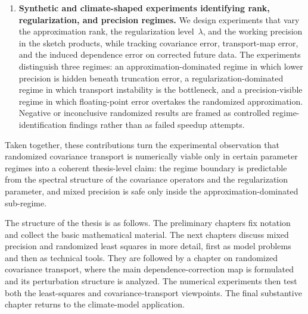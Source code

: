 \begin{enumerate}
	\item \textbf{Synthetic and climate-shaped experiments identifying rank,
		      regularization, and precision regimes.}
	      We design experiments that vary the approximation rank, the
	      regularization level~\(\lambda\), and the working precision in the sketch
	      products, while tracking covariance error, transport-map error, and the
	      induced dependence error on corrected future data.  The experiments
	      distinguish three regimes: an approximation-dominated regime in which
	      lower precision is hidden beneath truncation error, a
	      regularization-dominated regime in which transport instability is the
	      bottleneck, and a precision-visible regime in which floating-point error
	      overtakes the randomized approximation.  Negative or inconclusive
	      randomized results are framed as controlled regime-identification findings
	      rather than as failed speedup attempts.
\end{enumerate}

Taken together, these contributions turn the experimental observation that
randomized covariance transport is numerically viable only in certain parameter
regimes into a coherent thesis-level claim: the regime boundary is predictable
from the spectral structure of the covariance operators and the regularization
parameter, and mixed precision is safe only inside the approximation-dominated
sub-regime.

The structure of the thesis is as follows. The preliminary chapters fix notation and
collect the basic mathematical material. The next chapters discuss mixed
precision and randomized least squares in more detail, first as model problems
and then as technical tools. They are followed by a chapter on randomized
covariance transport, where the main dependence-correction map is formulated and
its perturbation structure is analyzed. The numerical experiments then test both
the least-squares and covariance-transport viewpoints. The final substantive
chapter returns to the climate-model application.
